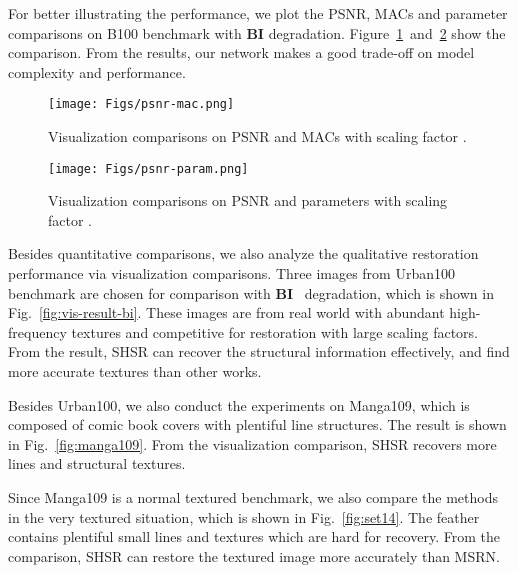 \documentclass[manuscript,screen]{acmart}
\begin{document}
For better illustrating the performance, we plot the PSNR, MACs and parameter comparisons on B100 benchmark with \textbf{BI} degradation. Figure~\ref{fig:psnr-mac}~and~\ref{fig:psnr-param} show the comparison. From the results, our network makes a good trade-off on model complexity and performance.

\begin{figure}[t]
	\centering
	\texttt{[image: Figs/psnr-mac.png]}
	\caption{Visualization comparisons on PSNR and MACs with scaling factor .}
	\label{fig:psnr-mac}
\end{figure}

\begin{figure}[t]
	\centering
	\texttt{[image: Figs/psnr-param.png]}
	\caption{Visualization comparisons on PSNR and parameters with scaling factor .}
	\label{fig:psnr-param}
\end{figure}





Besides quantitative comparisons, we also analyze the qualitative restoration performance via visualization comparisons. Three images from Urban100 benchmark are chosen for comparison with \textbf{BI}~ degradation, which is shown in Fig.~\ref{fig:vis-result-bi}. These images are from real world with abundant high-frequency textures and competitive for restoration with large scaling factors. From the result, SHSR can recover the structural information effectively, and find more accurate textures than other works.

Besides Urban100, we also conduct the experiments on Manga109, which is composed of comic book covers with plentiful line structures. The result is shown in Fig.~\ref{fig:manga109}. From the visualization comparison, SHSR recovers more lines and structural textures.

Since Manga109 is a normal textured benchmark, we also compare the methods in the very textured situation, which is shown in Fig.~\ref{fig:set14}. The feather contains plentiful small lines and textures which are hard for recovery. From the comparison, SHSR can restore the textured image more accurately than MSRN.
\end{document}
